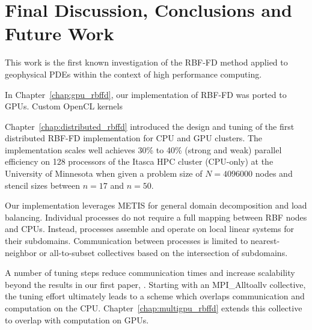 \chapter{Final Discussion, Conclusions and Future Work}
\label{chap:conclusions}

This work is the first known investigation of the RBF-FD method applied to geophysical PDEs within the context of high performance computing. 

In Chapter~\ref{chap:gpu_rbffd}, our implementation of RBF-FD was ported to GPUs. Custom OpenCL kernels 


Chapter~\ref{chap:distributed_rbffd} introduced the design and tuning of the first distributed RBF-FD implementation for CPU and GPU clusters. The implementation scales well achieves 30\% to 40\% (strong and weak) parallel efficiency on 128 processors of the Itasca HPC cluster (CPU-only) at the University of Minnesota when given a problem size of $N=4096000$ nodes and stencil sizes between $n=17$ and $n=50$. 

Our implementation leverages METIS for general domain decomposition and load balancing. Individual processes do not require a full mapping between RBF nodes and CPUs. Instead, processes assemble and operate on local linear systems for their subdomains. Communication between processes is limited to nearest-neighbor or all-to-subset collectives based on the intersection of subdomains. 

A number of tuning steps reduce communication times and increase scalability beyond the results in our first paper, \cite{BolligFlyerErlebacher2012}. Starting with an MPI\_Alltoallv collective, the tuning effort ultimately leads to a scheme which overlaps communication and computation on the CPU. Chapter~\ref{chap:multigpu_rbffd} extends this collective to overlap with computation on GPUs. 




